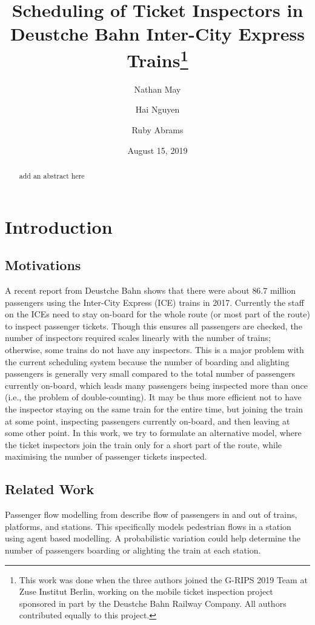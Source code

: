 \documentclass[11pt]{article}
\title{Scheduling of Ticket Inspectors in Deustche Bahn Inter-City Express Trains\footnote{This work was done when the three authors joined the G-RIPS 2019 Team at Zuse Institut Berlin,  working
on the mobile ticket inspection
project sponsored in part 
by the Deustche Bahn Railway Company. All authors contributed equally to this project.}}
\author[1]{Nathan May}
\author[2]{Hai Nguyen}
\author[3]{Ruby Abrams}
\affil[1]{Department of Mathematics,  Washington State University, U.S.A.}
\affil[2]{School of Computer Science,  University of Birmingham, U.K.}
\affil[3]{Department of Mathematics,  University of Arizona, U.S.A.}
\date{August 15, 2019}
\begin{document}
\maketitle

\begin{abstract}
add an abstract here
\end{abstract}

\tableofcontents

\section{Introduction}

\subsection{Motivations}

\par A recent report from Deustche Bahn \cite{DBFactFigure2017} shows that 
there were about $86.7$ million passengers using 
the Inter-City Express (ICE) trains in 2017. 
Currently the staff on the ICEs 
need to stay on-board for the whole route (or most part of the route) to inspect passenger tickets. Though this ensures all passengers are checked,
the number of inspectors required scales linearly with the number of trains; otherwise, some trains
do not have any inspectors. This is a major problem with the current scheduling system because
the number of boarding and alighting passengers is generally very small compared to the 
total number of passengers currently on-board, which leads many passengers being
inspected more than once (i.e., the problem of double-counting). It may be thus more
efficient not to have the inspector staying on the same train for the entire time, but joining 
the train at some point, inspecting passengers currently on-board, and then leaving at some other
point. In this work, we try to formulate an alternative
model, where the ticket inspectors join the train 
only for a short part of the route, while maximising the number of passenger tickets inspected. 
  
\subsection{Related Work}

\par Passenger flow modelling from \cite{gao_jia_2016} describe flow of passengers in and out of trains, platforms, and stations. This specifically models pedestrian flows in a station using agent based modelling. A probabilistic variation could help determine the number of passengers boarding or alighting the train at each station.
\end{document}
